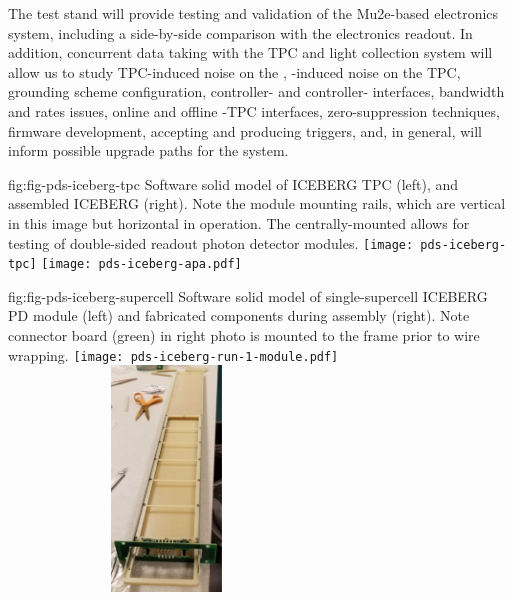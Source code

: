 The test stand will provide testing and validation of the  Mu2e-based electronics system, including a side-by-side comparison with the   electronics readout. In addition, concurrent data taking with the TPC and light collection system will allow us to study TPC-induced noise on the , -induced noise on the TPC, grounding scheme configuration, controller- and controller- interfaces, bandwidth and rates issues, online and offline -TPC interfaces, zero-suppression techniques, firmware development, accepting and producing triggers, and, in general, will inform possible upgrade paths for the system. 


\begin{dunefigure}
 {fig:fig-pds-iceberg-tpc}
 {Software solid model of ICEBERG TPC (left), and assembled ICEBERG  (right).  Note the  module mounting rails, which are vertical in this image but horizontal in operation. The centrally-mounted  allows for testing of double-sided readout photon detector modules.}
\texttt{[image: pds-iceberg-tpc]}
\texttt{[image: pds-iceberg-apa.pdf]}
\end{dunefigure}

\begin{dunefigure}
 {fig:fig-pds-iceberg-supercell}
 {Software solid model of single-supercell ICEBERG PD module (left) and fabricated components during assembly (right).  Note connector board (green) in right photo is mounted to the  frame prior to wire wrapping.}
\texttt{[image: pds-iceberg-run-1-module.pdf]}
\includegraphics[angle=0,width=8.4cm,height=6cm]{graphics/pds-iceberg-module-assembly-photo.pdf}
\end{dunefigure}


